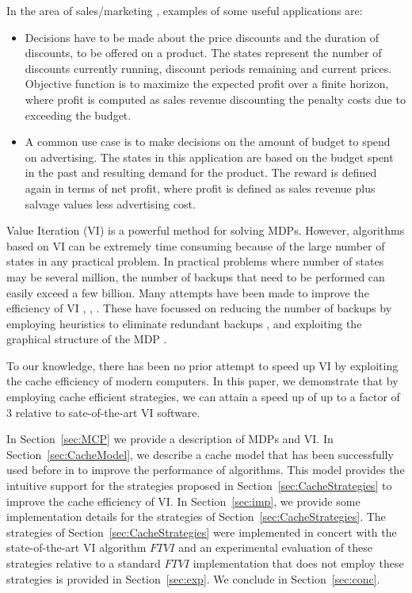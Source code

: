 \documentclass[conference]{IEEEtran}
\begin{document}
In the area of sales/marketing \cite{b9}, examples of some useful applications are:
\begin{itemize}
\item Decisions have to be made about the price discounts and the duration of discounts, to be offered on a product. The states represent the number of discounts currently running, discount periods remaining and current prices. Objective function is to maximize the expected profit over a finite horizon, where profit is computed as sales revenue discounting the penalty costs due to exceeding the budget.
\item A common use case is to make decisions on the amount of budget to spend on advertising. The states in this application are based on the budget spent in the past and resulting demand for the product. The reward is defined again in terms of net profit, where profit is defined as sales revenue plus salvage values less advertising cost.
\end {itemize}

Value Iteration (VI) \cite{suttonbook} is a powerful method for solving MDPs. However, algorithms based on VI can be extremely time consuming because of the large number of states in any practical problem. In practical problems where number of states may be several million, the number of backups that need to be performed can easily exceed a few billion. Many attempts have been made to improve the
efficiency of VI \cite{b10}, \cite{b11}, \cite{wingate_seppi2}. These have focussed on reducing the number of backups
by employing heuristics to eliminate redundant backups \cite{b10}, \cite{b11} and exploiting the 
graphical structure of the MDP \cite{b10}.

To our knowledge, there has been no prior attempt to speed up VI
by exploiting the cache efficiency of modern computers.
In this paper, we demonstrate that by employing cache efficient strategies, we can attain a speed up of up to a factor of 3 relative to sate-of-the-art VI software.

In Section~\ref{sec:MCP} we provide a description of MDPs and VI. In Section~\ref{sec:CacheModel}, we
describe a cache model that has been successfully used before in \cite{chunchun-sahni} to improve the performance of algorithms. This model provides the intuitive support for the strategies proposed in Section~\ref{sec:CacheStrategies} to improve the cache efficiency of VI.
In Section~\ref{sec:imp}, we provide some implementation details for the strategies of Section~\ref{sec:CacheStrategies}. The strategies of Section~\ref{sec:CacheStrategies} were implemented in concert with the state-of-the-art VI algorithm $FTVI$ \cite{b10} and an experimental
evaluation of these strategies relative to a standard $FTVI$ implementation
that does not employ these strategies is provided in Section~\ref{sec:exp}.
We conclude in Section~\ref{sec:conc}.
\end{document}

